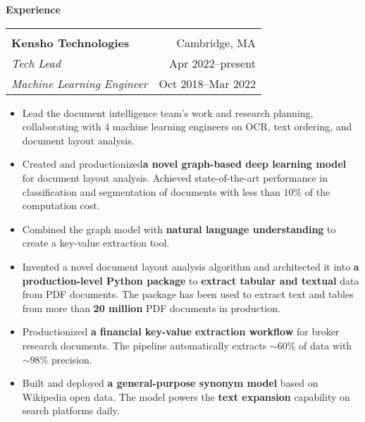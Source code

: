 \documentclass[letterpaper,11pt,oneside]{article}
\begin{document}
 \vspace{-0.35cm}
 \raggedright
 \textbf{\Large{Experience}} \sout{\hfill} \\
 \normalsize  
\begin{flushleft}
 \vspace{-0.45cm}
 \begin{tabular}{@{} l r@{} }
    \hspace{0.78\linewidth} & \hspace{0.2\linewidth} \\
    \textbf{Kensho Technologies} & Cambridge, MA \\ 
    \textit{Tech Lead} & Apr 2022--present \\ 
    \textit{Machine Learning Engineer} & Oct 2018--Mar 2022 \\ 
 \end{tabular}
 \end{flushleft}
 \begin{flushleft}
 \begin{small}
 \begin{itemize}[leftmargin=*]
 \item Lead the document intelligence team's work and research planning, collaborating with 4 machine learning engineers on OCR, text ordering, and document layout analysis.
 \item Created and productionized\textbf{a novel graph-based deep learning model} for document layout analysis. Achieved state-of-the-art performance in classification and segmentation of documents with less than $10\%$ of the computation cost. 
 \item Combined the graph model with \textbf{natural language understanding} to create a key-value extraction tool. 
 \item Invented a novel document layout analysis algorithm and architected it into \textbf{a production-level Python package} to \textbf{extract tabular and textual} data from PDF documents. The package has been used to extract text and tables from more than \textbf{20 million} PDF documents in production.
 \item Productionized  \textbf{a financial key-value extraction workflow} for broker research documents. The pipeline automatically extracts $\sim60\%$ of data with $\sim98\%$ precision.
 \item Built and deployed \textbf{a general-purpose synonym model} based on Wikipedia open data. The model powers the \textbf{text expansion} capability on search platforms daily.
 \end{itemize}
 \end{small}
 \end{flushleft}
\end{document}
